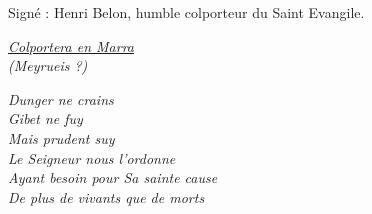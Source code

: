 Signé : Henri Belon, humble colporteur du Saint Evangile.

\vspace{0.7em}

\begin{center}
\textit{\underline{Colportera en Marra}}\\
\textit{(Meyrueis ?)}

\vspace{0.55em}

\textit{Dunger ne crains}\\
\textit{Gibet ne fuy}\\
\textit{Mais prudent suy}\\
\textit{Le Seigneur nous l’ordonne}\\
\textit{Ayant besoin pour Sa sainte cause}\\
\textit{De plus de vivants que de morts}
\end{center}

